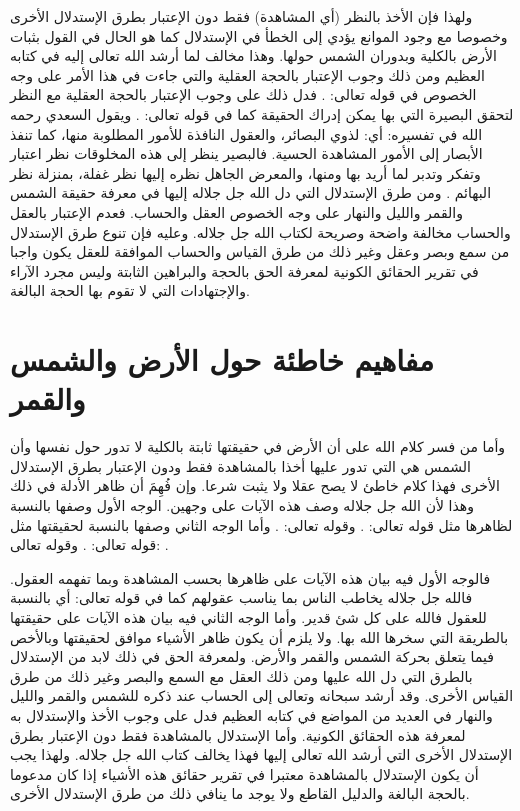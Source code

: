 ولهذا فإن الأخذ بالنظر (أي المشاهدة) فقط دون الإعتبار بطرق الإستدلال الأخرى وخصوصا مع وجود الموانع يؤدي إلى الخطأ في الإستدلال كما هو الحال في القول بثبات الأرض بالكلية وبدوران الشمس حولها. وهذا مخالف لما أرشد الله تعالى إليه في كتابه العظيم ومن ذلك وجوب الإعتبار بالحجة العقلية والتي جاءت في هذا الأمر على وجه الخصوص في قوله تعالى: \quranayah*[3][190]{\footnotesize \surahname*[3]}. فدل ذلك على وجوب الإعتبار بالحجة العقلية مع النظر لتحقق البصيرة التي بها يمكن إدراك الحقيقة كما في قوله تعالى: \quranayah*[24][44]{\footnotesize \surahname*[24]}. ويقول السعدي رحمه الله في تفسيره: أي: لذوي البصائر، والعقول النافذة للأمور المطلوبة منها، كما تنفذ الأبصار إلى الأمور المشاهدة الحسية. فالبصير ينظر إلى هذه المخلوقات نظر اعتبار وتفكر وتدبر لما أريد بها ومنها، والمعرض الجاهل نظره إليها نظر غفلة، بمنزلة نظر البهائم \cite{tafsir_Saadi}. ومن طرق الإستدلال التي دل الله جل جلاله إليها في معرفة حقيقة الشمس والقمر والليل والنهار على وجه الخصوص العقل والحساب. فعدم الإعتبار بالعقل والحساب مخالفة واضحة وصريحة لكتاب الله جل جلاله. وعليه فإن تنوع طرق الإستدلال من سمع وبصر وعقل وغير ذلك من طرق القياس والحساب الموافقة للعقل يكون واجبا في تقرير الحقائق الكونية لمعرفة الحق بالحجة والبراهين الثابتة وليس مجرد الآراء والإجتهادات التي لا تقوم بها الحجة البالغة.

\section{مفاهيم خاطئة حول الأرض والشمس والقمر}

وأما من فسر كلام الله على أن الأرض في حقيقتها ثابتة بالكلية لا تدور حول نفسها وأن الشمس هي التي تدور عليها أخذا بالمشاهدة فقط ودون الإعتبار بطرق الإستدلال الأخرى فهذا كلام خاطئ لا يصح عقلا ولا يثبت شرعا. وإن فُهِمَ أن ظاهر الأدلة في ذلك وهذا لأن الله جل جلاله وصف هذه الآيات على وجهين. الوجه الأول وصفها بالنسبة لظاهرها مثل قوله تعالى: 
\quranayah*[2][258][24-35] {\footnotesize (\surahname*[2])}. وقوله تعالى: 
\quranayah*[18][17][1-14] {\footnotesize (\surahname*[18])}. وأما الوجه الثاني وصفها بالنسبة لحقيقتها مثل قوله تعالى: 
\quranayah*[21][31-33] {\footnotesize (\surahname*[21])}. وقوله تعالى: 
\quranayah*[36][37-40] {\footnotesize (\surahname*[36])}. 

فالوجه الأول فيه بيان هذه الآيات على ظاهرها بحسب المشاهدة وبما تفهمه العقول.
فالله جل جلاله يخاطب الناس بما يناسب عقولهم كما في قوله تعالى: \quranayah*[30][27][7-9] {\footnotesize (\surahname*[30])} أي بالنسبة للعقول فالله على كل شئ قدير. وأما الوجه الثاني فيه بيان هذه الآيات على حقيقتها بالطريقة التي سخرها الله بها. ولا يلزم أن يكون ظاهر الأشياء موافق لحقيقتها وبالأخص فيما يتعلق بحركة الشمس والقمر والأرض. ولمعرفة الحق في ذلك لابد من الإستدلال بالطرق التي دل الله عليها ومن ذلك العقل مع السمع والبصر وغير ذلك من طرق القياس الأخرى. وقد أرشد سبحانه وتعالى إلى الحساب عند ذكره للشمس والقمر والليل والنهار في العديد من المواضع في كتابه العظيم فدل على وجوب الأخذ والإستدلال به لمعرفة هذه الحقائق الكونية. وأما الإستدلال بالمشاهدة فقط دون الإعتبار بطرق الإستدلال الأخرى التي أرشد الله تعالى إليها فهذا يخالف كتاب الله جل جلاله. ولهذا يجب أن يكون الإستدلال بالمشاهدة معتبرا في تقرير حقائق هذه الأشياء إذا كان مدعوما بالحجة البالغة والدليل القاطع ولا يوجد ما ينافي ذلك من طرق الإستدلال الأخرى.

